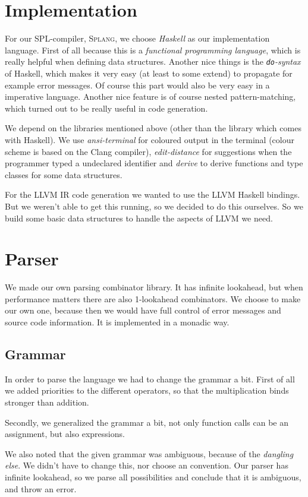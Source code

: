 \documentclass[11pt]{amsart}
\newcommand{\llvm}{\textsc{LLVM}\xspace}
\newcommand{\splang}{\textsc{Splang}\xspace}
\begin{document}
\section{Implementation}
For our SPL-compiler, \splang, we choose \emph{Haskell} as our implementation language. First of all because this is a \emph{functional programming language}, which is really helpful when defining data structures. Another nice things is the \emph{\texttt{do}-syntax} of Haskell, which makes it very easy (at least to some extend) to propagate for example error messages. Of course this part would also be very easy in a imperative language. Another nice feature is of course nested pattern-matching, which turned out to be really useful in code generation.

We depend on the libraries mentioned above (other than the library which comes with Haskell). We use \emph{ansi-terminal} for coloured output in the terminal (colour scheme is based on the {\sc Clang} compiler), \emph{edit-distance} for suggestions when the programmer typed a undeclared identifier and \emph{derive} to derive functions and type classes for some data structures.

For the \llvm IR code generation we wanted to use the \llvm Haskell bindings. But we weren't able to get this running, so we decided to do this ourselves. So we build some basic data structures to handle the aspects of \llvm we need.

\section{Parser}
We made our own parsing combinator library. It has infinite lookahead, but when performance matters there are also 1-lookahead combinators. We choose to make our own one, because then we would have full control of error messages and source code information. It is implemented in a monadic way.

\subsection{Grammar}
In order to parse the language we had to change the grammar a bit. First of all we added priorities to the different operators, so that the multiplication binds stronger than addition.

Secondly, we generalized the grammar a bit, not only function calls can be an assignment, but also expressions.

We also noted that the given grammar was ambiguous, because of the \emph{dangling else}. We didn't have to change this, nor choose an convention. Our parser has infinite lookahead, so we parse all possibilities and conclude that it is ambiguous, and throw an error.
\end{document}
